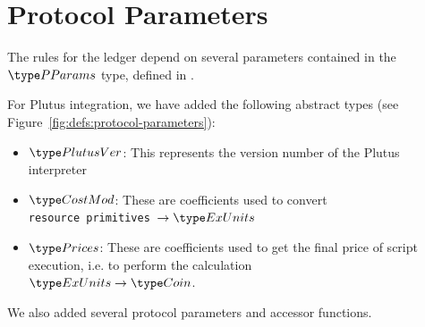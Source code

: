 \section{Protocol Parameters}
\label{sec:protocol-parameters}

The rules for the ledger depend on several parameters contained in the $\PParams$ type,
defined in \cite{byron_ledger_spec}.

For Plutus integration, we have added the following abstract types
(see Figure~\ref{fig:defs:protocol-parameters}):

\begin{itemize}
\item $\PlutusVer$: This represents the version number of the Plutus interpreter
\item $\CostMod$: These are coefficients used to convert \\
\texttt{resource primitives}~$\to \ExUnits$
\item $\Prices$: These are coefficients used to get the final price of script
execution, i.e. to perform the calculation \\
$\ExUnits \to \Coin$.
\end{itemize}

We also added several protocol parameters and accessor functions.


